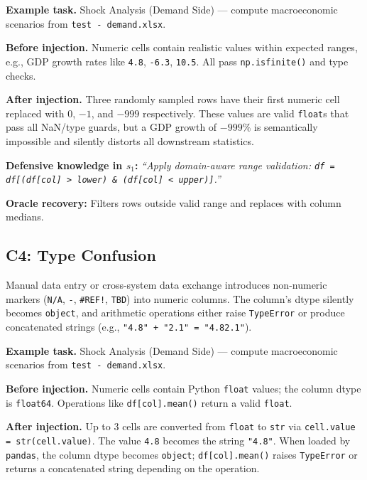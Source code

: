 \documentclass[11pt]{article}
\begin{document}
\textbf{Example task.} Shock Analysis (Demand Side) --- compute macroeconomic scenarios from \texttt{test - demand.xlsx}.

\textbf{Before injection.} Numeric cells contain realistic values within expected ranges, e.g., GDP growth rates like \texttt{4.8}, \texttt{-6.3}, \texttt{10.5}. All pass \texttt{np.isfinite()} and type checks.

\textbf{After injection.} Three randomly sampled rows have their first numeric cell replaced with $0$, $-1$, and $-999$ respectively. These values are valid \texttt{float}s that pass all NaN/type guards, but a GDP growth of $-999$\% is semantically impossible and silently distorts all downstream statistics.

\textbf{Defensive knowledge in $s_1$:} \textit{``Apply domain-aware range validation: \texttt{df = df[(df[col] > lower) \& (df[col] < upper)]}.''}

\textbf{Oracle recovery:} Filters rows outside valid range and replaces with column medians.

\subsection{C4: Type Confusion}

\begin{anomalyblock}
Manual data entry or cross-system data exchange introduces non-numeric markers (\texttt{N/A}, \texttt{-}, \texttt{\#REF!}, \texttt{TBD}) into numeric columns. The column's dtype silently becomes \texttt{object}, and arithmetic operations either raise \texttt{TypeError} or produce concatenated strings (e.g., \texttt{"4.8" + "2.1" = "4.82.1"}).
\end{anomalyblock}

\textbf{Example task.} Shock Analysis (Demand Side) --- compute macroeconomic scenarios from \texttt{test - demand.xlsx}.

\textbf{Before injection.} Numeric cells contain Python \texttt{float} values; the column dtype is \texttt{float64}. Operations like \texttt{df[col].mean()} return a valid \texttt{float}.

\textbf{After injection.} Up to 3 cells are converted from \texttt{float} to \texttt{str} via \texttt{cell.value = str(cell.value)}. The value \texttt{4.8} becomes the string \texttt{"4.8"}. When loaded by \texttt{pandas}, the column dtype becomes \texttt{object}; \texttt{df[col].mean()} raises \texttt{TypeError} or returns a concatenated string depending on the operation.
\end{document}
